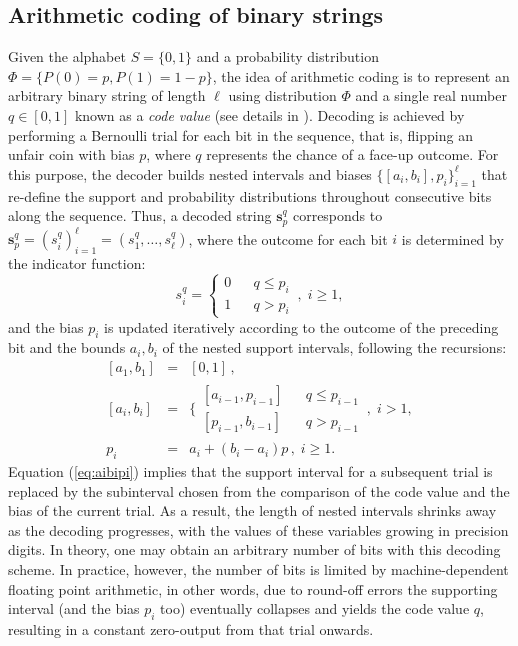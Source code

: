 \documentclass{sig-alternate}
\newcommand{\bs}{{\mathbf s}}
\newcommand{\bone}[2]{\mathbf{1}_{#1}(#2)}
\begin{document}
\subsection{Arithmetic coding of binary strings}
Given the alphabet $S=\{0,1\}$ and a probability distribution $\Phi=\{P(0)\!=\!p,P(1)\!=\!1-p\}$, the idea of arithmetic coding is to represent an arbitrary binary string of length $\ell$ using distribution $\Phi$ and a single real number $q \in [0,1]$ known as a \emph{code value} (see details in \cite{Said04}). Decoding is achieved by performing a Bernoulli trial for each bit in the sequence, that is, flipping an unfair coin with bias $p$, where $q$ represents the chance of a face-up outcome. For this purpose, the decoder builds nested intervals and biases $\{[a_i,b_i],p_i\}_{i=1}^{\ell}$ that re-define the support and probability distributions throughout consecutive bits along the sequence. Thus, a decoded string $\bs_p^q$ corresponds to $\bs_p^q = (s_i^q)_{i=1}^\ell = (s_1^q, \ldots, s_\ell^q)$, where the outcome for each bit $i$ is determined by the indicator function: 
\begin{equation}
s_i^q= \left\{\begin{matrix} 0&& q \le p_i \\ 1&& q > p_i \end{matrix} \right. \,,\; i \ge 1, \label{eq:spi}
\end{equation}
and the bias $p_i$ is updated iteratively according to the outcome of the preceding bit and the bounds $a_i, b_i$ of the nested support intervals, following the recursions: 
\begin{equation}
\begin{array}{lll}
\left[a_1, b_1 \right] &=& [0, 1] \,, \\
\left[a_i, b_i \right] &=& \Bigg \{\begin{matrix} [a_{i-1}, p_{i-1}] && q \le p_{i-1} \\ [p_{i-1}, b_{i-1}] && q > p_{i-1} \end{matrix} \,,\; i>1, \\
p_i &=& a_{i}+(b_{i}-a_{i})p \,,\; i \ge 1.  
\end{array} 
\label{eq:aibipi}
\end{equation} 
Equation (\ref{eq:aibipi}) implies that the support interval for a subsequent trial is replaced by the subinterval chosen from the comparison of the code value and the bias of the current trial. As a result, the length of nested intervals shrinks away as the decoding progresses, with the values of these variables growing in precision digits. In theory, one may obtain an arbitrary number of bits with this decoding scheme. In practice, however, the number of bits is limited by machine-dependent floating point arithmetic, in other words, due to round-off errors the supporting interval (and the bias $p_i$ too) eventually collapses and yields the code value $q$, resulting in a constant zero-output from that trial onwards. 
\end{document}
